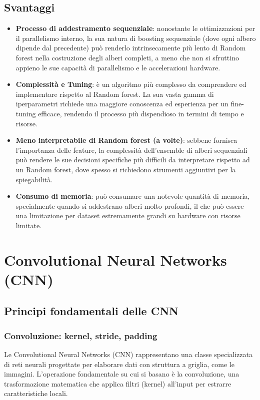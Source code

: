 \documentclass[a4paper,12pt]{report}
\begin{document}
	\section{Svantaggi}
	
	\begin{itemize}
		\item \textbf{Processo di addestramento sequenziale}: nonostante le ottimizzazioni per il parallelismo interno, la sua natura di boosting sequenziale (dove ogni albero dipende dal precedente) può renderlo intrinsecamente più lento di Random forest nella costruzione degli alberi completi, a meno che non si sfruttino appieno le sue capacità di parallelismo e le accelerazioni hardware.
		\item \textbf{Complessità e Tuning}: è un algoritmo più complesso da comprendere ed implementare rispetto al Random forest. La sua vasta gamma di iperparametri richiede una maggiore conoscenza ed esperienza per un fine-tuning efficace, rendendo il processo più dispendioso in termini di tempo e risorse.
		\item \textbf{Meno interpretabile di Random forest (a volte)}: sebbene fornisca l'importanza delle feature, la complessità dell'ensemble di alberi sequenziali può rendere le sue decisioni specifiche più difficili da interpretare rispetto ad un Random forest, dove spesso si richiedono strumenti aggiuntivi per la spiegabilità.
		\item \textbf{Consumo di memoria}: può consumare una notevole quantità di memoria, specialmente quando si addestrano alberi molto profondi, il che può essere una limitazione per dataset estremamente grandi su hardware con risorse limitate.
	\end{itemize}
	
	\chapter{Convolutional Neural Networks (CNN)}
	
	\section{Principi fondamentali delle CNN}
	
	\subsection{Convoluzione: kernel, stride, padding}
	Le Convolutional Neural Networks (CNN) rappresentano una classe specializzata di reti neurali progettate per elaborare dati con struttura a griglia, come le immagini. L'operazione fondamentale su cui si basano è la convoluzione, una trasformazione matematica che applica filtri (kernel) all'input per estrarre caratteristiche locali.
	
\end{document}
